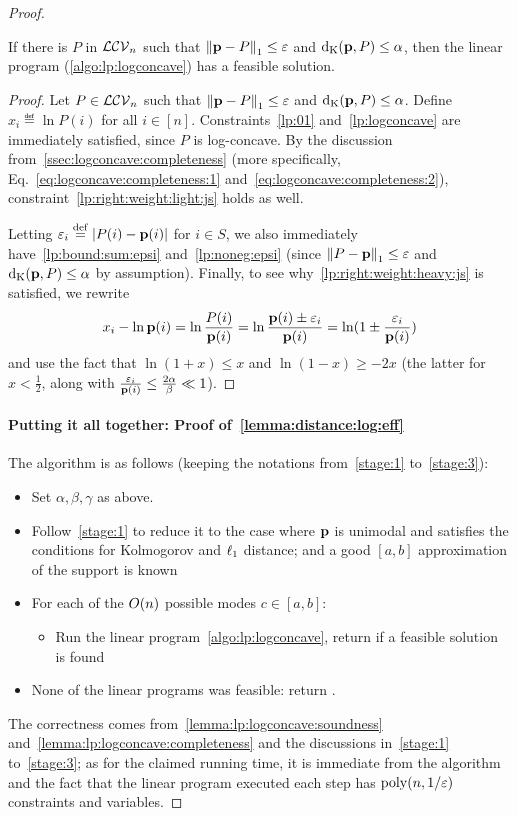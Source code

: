 \begin{proof}
\begin{lemma}[Completeness]\label{lemma:lp:logconcave:completeness}
If there is $P$ in $\classlogconcave$ such that $\normone{\D-P}\leq \eps$ and $\kolmogorov{\D}{P}\leq \alpha$, then the linear program (\cref{algo:lp:logconcave}) has a feasible solution.
\end{lemma}
\begin{proof}
 Let $P\in\classlogconcave$ such that $\normone{\D - P}\leq \eps$ and $\kolmogorov{\D}{P}\leq \alpha$.
 Define $x_i\eqdef \ln P(i)$ for all $i\in[n]$. Constraints~\eqref{lp:01} and~\eqref{lp:logconcave} are immediately satisfied, since $P$ is log-concave. By the discussion from~\cref{ssec:logconcave:completeness} (more specifically, Eq.~\eqref{eq:logconcave:completeness:1} and~\eqref{eq:logconcave:completeness:2}), constraint~\eqref{lp:right:weight:light:js} holds as well.
 
 Letting $\eps_i\eqdef \abs{P(i)-\D(i)}$ for $i\in S$, we also immediately have~\eqref{lp:bound:sum:epsi} and~\eqref{lp:noneg:epsi} (since $\normone{P-\D} \leq \eps$ and $\kolmogorov{\D}{P}\leq \alpha$ by assumption). Finally, to see why~\eqref{lp:right:weight:heavy:js} is satisfied, we rewrite
 \[
      x_i - \ln\D(i) = \ln\frac{P(i)}{\D(i)} =  \ln\frac{\D(i)\pm\eps_i}{\D(i)} = \ln(1\pm \frac{\eps_i}{\D(i)})
 \] 
 and use the fact that $\ln(1+x) \leq x$ and $\ln(1-x) \geq -2x$ (the latter for $x < \frac{1}{2}$, along with $\frac{\eps_i}{\D(i)} \leq \frac{2\alpha}{\beta} \ll 1$).
\end{proof}

\paragraph{Putting it all together: Proof of~\cref{lemma:distance:log:eff}}

The algorithm is as follows (keeping the notations from~\cref{stage:1} to~\cref{stage:3}):
\begin{itemize}
  \item Set $\alpha,\beta,\gamma$ as above.
  \item Follow~\cref{stage:1} to reduce it to the case where $\D$ is unimodal and satisfies the conditions for Kolmogorov and $\lp[1]$ distance; and a good $[a,b]$ approximation of the support is known
  \item For each of the $\bigO{n}$ possible modes $c\in[a,b]$:
  \begin{itemize}
    \item Run the linear program~\cref{algo:lp:logconcave}, return \accept if a feasible solution is found
  \end{itemize}
  \item None of the linear programs was feasible: return \reject.
\end{itemize}

The correctness comes from~\cref{lemma:lp:logconcave:soundness} and~\cref{lemma:lp:logconcave:completeness} and the discussions in~\cref{stage:1} to~\cref{stage:3}; as for the claimed running time, it is immediate from the algorithm and the fact that the linear program executed each step has $\poly(n,1/\eps)$ constraints and variables.

\end{proof}
